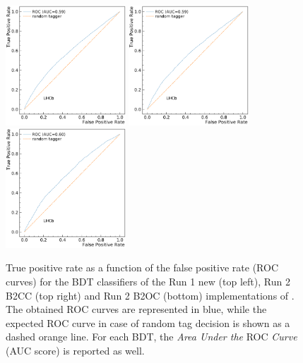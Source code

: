 \begin{figure}[t]
        \begin{center}
        \includegraphics[width=0.4\textwidth]{04Flavourtagging/figs/OSelectronOpt/2017-12-12-vibattis-OSElectron-bdt-calibration-sWeights_Run1/ROC_RunIcuts.pdf}
        \includegraphics[width=0.4\textwidth]{04Flavourtagging/figs/OSelectronOpt/2017-12-12-vibattis-OSElectron-bdt-calibration-sWeights_Run2/ROC_RunIIcuts.pdf} \\
        \includegraphics[width=0.4\textwidth]{04Flavourtagging/figs/OSelectronOpt/2018-04-07-vibattis-OSElectron-bdt-calibration-sWeights_Run2_Bu2D0pi/ROC_RunIIcuts.pdf}
        \end{center}
        \vspace{-2mm}
        \caption{True positive rate as a function of the false positive rate (ROC curves) for the BDT classifiers of the Run 1 new (top left), Run 2 B2CC (top right) and Run 2 B2OC (bottom) implementations of \OSe. The obtained ROC curves are represented in blue, while the expected ROC curve in case of random tag decision is shown as a dashed orange line. For each BDT, the \emph{Area Under the} ROC \emph{Curve} (AUC score) is reported as well.}
         \label{fig:OSerocs}
\end{figure}

